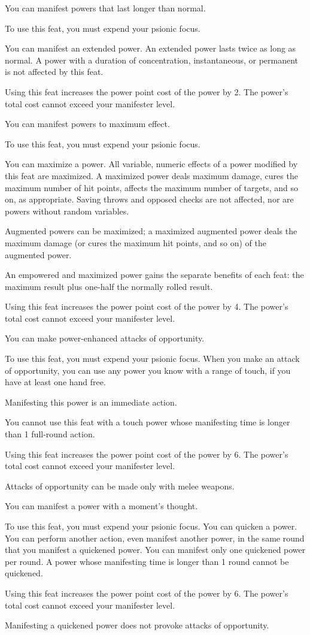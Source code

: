 {You can manifest powers that last longer than normal.}
{}
{To use this feat, you must expend your psionic focus.

You can manifest an extended power. An extended power lasts twice as long as normal. A power with a duration of concentration, instantaneous, or permanent is not affected by this feat.

Using this feat increases the power point cost of the power by 2. The power’s total cost cannot exceed your manifester level.}{}{}

{You can manifest powers to maximum effect.}
{}
{To use this feat, you must expend your psionic focus.

You can maximize a power. All variable, numeric effects of a power modified by this feat are maximized. A maximized power deals maximum damage, cures the maximum number of hit points, affects the maximum number of targets, and so on, as appropriate. Saving throws and opposed checks are not affected, nor are powers without random variables.

Augmented powers can be maximized; a maximized augmented power deals the maximum damage (or cures the maximum hit points, and so on) of the augmented power.

An empowered and maximized power gains the separate benefits of each feat: the maximum result plus one-half the normally rolled result.

Using this feat increases the power point cost of the power by 4. The power’s total cost cannot exceed your manifester level.}{}{}

{You can make power-enhanced attacks of opportunity.}
{}
{To use this feat, you must expend your psionic focus. When you make an attack of opportunity, you can use any power you know with a range of touch, if you have at least one hand free.

Manifesting this power is an immediate action.

You cannot use this feat with a touch power whose manifesting time is longer than 1 full-round action.

Using this feat increases the power point cost of the power by 6. The power’s total cost cannot exceed your manifester level.}
{Attacks of opportunity can be made only with melee weapons.}{}

{You can manifest a power with a moment’s thought.}
{}
{To use this feat, you must expend your psionic focus. You can quicken a power. You can perform another action, even manifest another power, in the same round that you manifest a quickened power. You can manifest only one quickened power per round. A power whose manifesting time is longer than 1 round cannot be quickened.

Using this feat increases the power point cost of the power by 6. The power’s total cost cannot exceed your manifester level.

Manifesting a quickened power does not provoke attacks of opportunity.}{}{}

